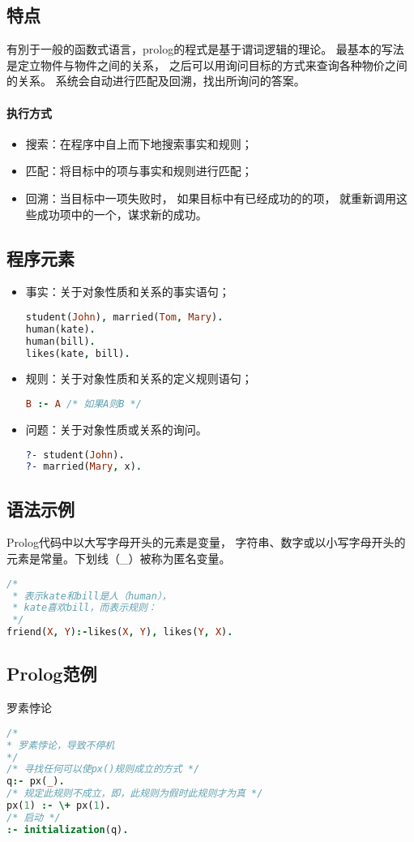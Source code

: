 \subsection*{特点}
有別于一般的函数式语言，prolog的程式是基于谓词逻辑的理论。
最基本的写法是定立物件与物件之间的关系，
之后可以用询问目标的方式来查询各种物价之间的关系。
系统会自动进行匹配及回溯，找出所询问的答案。

\paragraph{执行方式}
\begin{itemize}
  \item 搜索：在程序中自上而下地搜索事实和规则；
  \item 匹配：将目标中的项与事实和规则进行匹配；
  \item 回溯：当目标中一项失败时，
    如果目标中有已经成功的的项，
    就重新调用这些成功项中的一个，谋求新的成功。
\end{itemize}

\subsection*{程序元素}
\begin{itemize}
  \item 事实：关于对象性质和关系的事实语句；
    \begin{lstlisting}[language=Prolog]
student(John), married(Tom, Mary).
human(kate).
human(bill).
likes(kate, bill).
    \end{lstlisting}

  \item 规则：关于对象性质和关系的定义规则语句；
    \begin{lstlisting}[language=Prolog]
B :- A /* 如果A则B */
    \end{lstlisting}

  \item 问题：关于对象性质或关系的询问。
    \begin{lstlisting}[language=Prolog]
?- student(John).
?- married(Mary, x).
    \end{lstlisting}
\end{itemize}

\subsection*{语法示例}
Prolog代码中以大写字母开头的元素是变量，
字符串、数字或以小写字母开头的元素是常量。下划线（\_）被称为匿名变量。
\begin{lstlisting}[language=Prolog]
/*
 * 表示kate和bill是人（human），
 * kate喜欢bill，而表示规则：
 */
friend(X, Y):-likes(X, Y), likes(Y, X).
\end{lstlisting}

\subsection{Prolog范例}
{\bfseries\raggedright 罗素悖论\par}
\begin{lstlisting}[language=Prolog]
/*
* 罗素悖论，导致不停机
*/
/* 寻找任何可以使px()规则成立的方式 */
q:- px(_).
/* 规定此规则不成立，即，此规则为假时此规则才为真 */
px(1) :- \+ px(1).
/* 启动 */
:- initialization(q).
\end{lstlisting}

